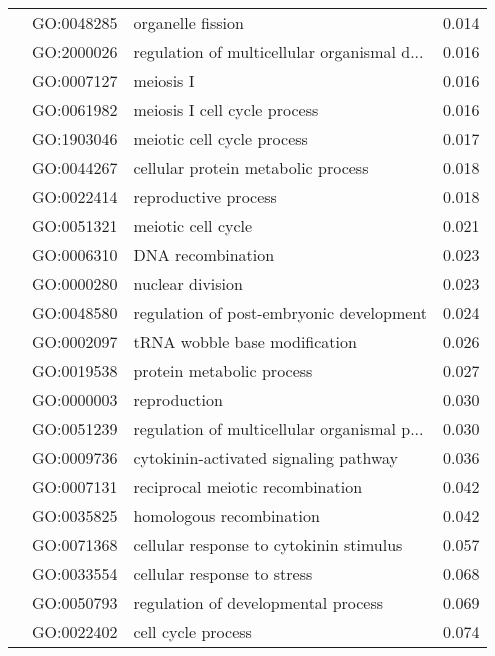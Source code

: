 \begin{longtable}{lllr}
   & GO:0048285 &                            organelle fission &         0.014 \\
   & GO:2000026 &  regulation of multicellular organismal d... &         0.016 \\
   & GO:0007127 &                                    meiosis I &         0.016 \\
   & GO:0061982 &                 meiosis I cell cycle process &         0.016 \\
   & GO:1903046 &                   meiotic cell cycle process &         0.017 \\
   & GO:0044267 &           cellular protein metabolic process &         0.018 \\
   & GO:0022414 &                         reproductive process &         0.018 \\
   & GO:0051321 &                           meiotic cell cycle &         0.021 \\
   & GO:0006310 &                            DNA recombination &         0.023 \\
   & GO:0000280 &                             nuclear division &         0.023 \\
   & GO:0048580 &     regulation of post-embryonic development &         0.024 \\
   & GO:0002097 &                tRNA wobble base modification &         0.026 \\
   & GO:0019538 &                    protein metabolic process &         0.027 \\
   & GO:0000003 &                                 reproduction &         0.030 \\
   & GO:0051239 &  regulation of multicellular organismal p... &         0.030 \\
   & GO:0009736 &        cytokinin-activated signaling pathway &         0.036 \\
   & GO:0007131 &             reciprocal meiotic recombination &         0.042 \\
   & GO:0035825 &                     homologous recombination &         0.042 \\
   & GO:0071368 &      cellular response to cytokinin stimulus &         0.057 \\
   & GO:0033554 &                  cellular response to stress &         0.068 \\
   & GO:0050793 &          regulation of developmental process &         0.069 \\
   & GO:0022402 &                           cell cycle process &         0.074 \\

\end{longtable}
